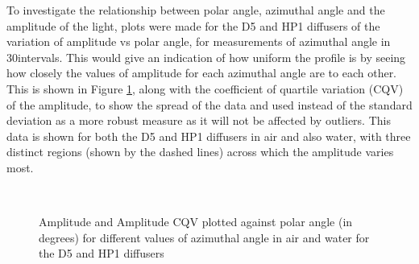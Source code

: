 To investigate the relationship between polar angle, azimuthal angle and the amplitude of the light, plots were made for the D5 and HP1 diffusers of the variation of amplitude vs polar angle, for measurements of azimuthal angle in 30\degree intervals. This would give an indication of how uniform the profile is by seeing how closely the values of amplitude for each azimuthal angle are to each other. This is shown in Figure \ref{fig:HP1_D5_azimuthal}, along with the coefficient of quartile variation (CQV) of the amplitude, to show the spread of the data and used instead of the standard deviation as a more robust measure as it will not be affected by outliers.  This data is shown for both the D5 and HP1 diffusers in air and also water, with three distinct regions (shown by the dashed lines) across which the amplitude varies most. 

\begin{figure}[!htbp]
    \centering
    
    \caption{Amplitude and Amplitude CQV plotted against polar angle (in degrees) for different values of azimuthal angle in air and water for the D5 and HP1 diffusers}\label{fig:HP1_D5_azimuthal}
    
    \\
    
\end{figure}

